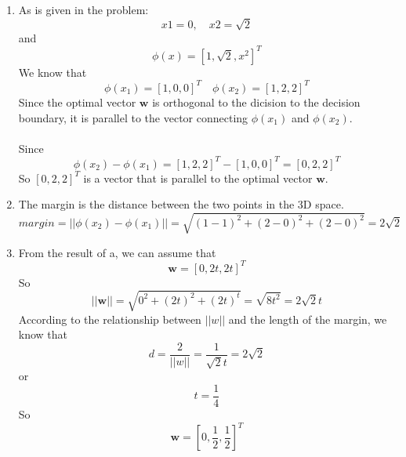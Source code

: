 \documentclass{article}
\begin{document}
        \begin{enumerate}[label=\alph*.]
            \item %
            As is given in the problem:
            \begin{equation}
            	x1=0,\quad x2=\sqrt{2}
            \end{equation}
            and
            \begin{equation}
            	\phi(x)=[1,\sqrt{2},x^2]^T
            \end{equation}
            We know that
            \begin{equation}
            	\phi(x_1)=[1,0,0]^T
            	\quad
            	\phi(x_2)=[1,2,2]^T
            \end{equation}
            Since the optimal vector $\boldsymbol{w}$ is orthogonal to the dicision to the decision boundary, it is parallel to the vector connecting $\phi(x_1)$ and $\phi(x_2)$.\\\\
            Since
            \begin{equation}
            	\phi(x_2)-\phi(x_1)=
            	[1,2,2]^T-[1,0,0]^T=
            	[0,2,2]^T
            \end{equation}
            So $[0,2,2]^T$ is a vector that is parallel to the optimal vector $\boldsymbol{w}$.
            
            \item %
            The margin is the distance between the two points in the 3D space.
            \begin{equation}
            	margin = ||\phi(x_2)-\phi(x_1)||
            	=\sqrt{(1-1)^2+(2-0)^2+(2-0)^2}
            	=2\sqrt{2}
            \end{equation}
            
            \item %
            From the result of a, we can assume that
            \begin{equation}
            	\boldsymbol{w} = [0,2t,2t]^T
            \end{equation}
            So
            \begin{equation}
            	||\boldsymbol{w}||
            	=\sqrt{0^2+(2t)^2+(2t)^t}
            	=\sqrt{8t^2}=2\sqrt{2}t
            \end{equation}
            According to the relationship between $||w||$ and the length of the margin, we know that
            \begin{equation}
            	d=\frac{2}{||w||}
            	=\frac{1}{\sqrt{2}t}=2\sqrt{2}
            \end{equation}
            or
            \begin{equation}
            	t=\frac{1}{4}
            \end{equation}
            So
            \begin{equation}
            	\boldsymbol{w}
            	=[0,\frac{1}{2},\frac{1}{2}]^T
            \end{equation}
            

\end{enumerate}
\end{document}
